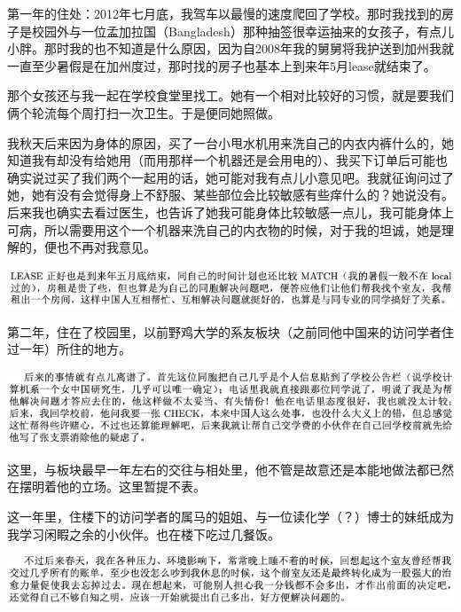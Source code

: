 \documentclass[9pt, b5paper]{article}
\begin{document}
第一年的住处：2012年七月底，我驾车以最慢的速度爬回了学校。那时我找到的房子是校园外与一位孟加拉国（Bangladesh）那种抽签很幸运抽来的女孩子，有点儿小胖。那时我的也不知道是什么原因，因为自2008年我的舅舅将我护送到加州我就一直至少暑假是在加州度过，那时找的房子也基本上到来年5月lease就结束了。

那个女孩还与我一起在学校食堂里找工。她有一个相对比较好的习惯，就是要我们俩个轮流每个周打扫一次卫生。于是便同她照做。

我秋天后来因为身体的原因，买了一台小甩水机用来洗自己的内衣内裤什么的，她知道我有却没有给她用（而用那样一个机器还是会用电的）、我买下订单后可能也确实说过买了我们两个一起用的话，她可能对我有点儿小意见吧。我就征询问过了她，她有没有会觉得身上不舒服、某些部位会比较敏感有些痒什么的？她说没有。后来我也确实去看过医生，也告诉了她我可能身体比较敏感一点儿，我可能身体上可病，所以需要用这个一个机器来洗自己的内衣物的时候，对于我的坦诚，她是理解的，便也不再对我意见。

\begin{center}
\includegraphics[width=.9\linewidth]{./pic/backups_plans_20210429_125611.png}
\end{center}

第二年，住在了校园里，以前野鸡大学的系友板块（之前同他中国来的访问学者住过一年）所住的地方。

\begin{center}
\includegraphics[width=.9\linewidth]{./pic/backups_plans_20210429_133936.png}
\end{center}

这里，与板块最早一年左右的交往与相处里，他不管是故意还是本能地做法都已然在摆明着他的立场。这里暂提不表。

这一年里，住楼下的访问学者的属马的姐姐、与一位读化学（？）博士的妹纸成为我学习闲睱之余的小伙伴。也在楼下吃过几餐饭。

\begin{center}
\includegraphics[width=.9\linewidth]{./pic/backups_plans_20210429_135654.png}
\end{center}
\end{document}
